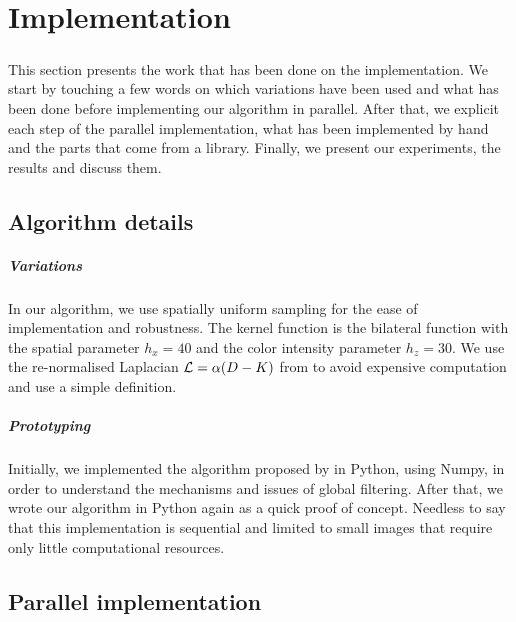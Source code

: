 \chapter{Implementation}

\paragraph{}
This section presents the work that has been done on the implementation.
We start by touching a few words on which variations have been used and what has been done before implementing our algorithm in parallel.
After that, we explicit each step of the parallel implementation, what has been implemented by hand and the parts that come from a library.
Finally, we present our experiments, the results and discuss them.

\section{Algorithm details}

\paragraph{Variations}
In our algorithm, we use spatially uniform sampling for the ease of implementation and robustness.
The kernel function is the bilateral function with the spatial parameter \(h_x = 40\) and the color intensity parameter \(h_z = 30\).
We use the re-normalised Laplacian \(\operatorname{\mathcal{L}} = \alpha (D-K)\) from \cite{milanfar_new_2016} to avoid expensive computation and use a simple definition.

\paragraph{Prototyping}
Initially, we implemented the algorithm proposed by \cite{glide_2014} in Python, using Numpy, in order to understand the mechanisms and issues of global filtering.
After that, we wrote our algorithm in Python again as a quick proof of concept.
Needless to say that this implementation is sequential and limited to small images that require only little computational resources.

\section{Parallel implementation}

